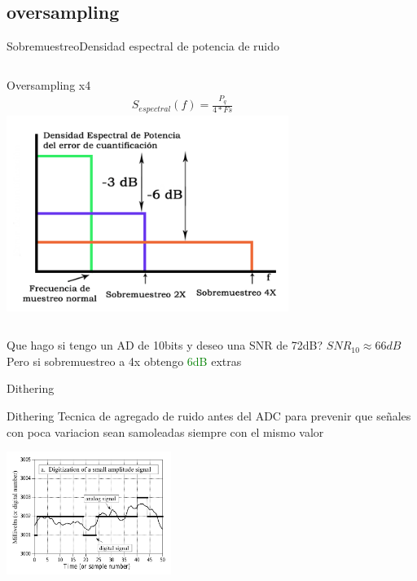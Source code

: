  \subsection{oversampling}
 \begin{frame}{Sobremuestreo}{Densidad espectral de potencia de ruido}
    \begin{columns}[onlytextwidth]
       Oversampling x4
       \begin{align*}
          S_{espectral}(f) = \frac{P_q}{4*Fs}
       \end{align*}
       \center\includegraphics[width=0.8\textwidth]{1_clase/oversampling}
    \end{columns}
    \vfill
    Que hago si tengo un AD de 10bits y deseo una SNR de 72dB?
    $SNR_{10}\approx 66dB$
    Pero si sobremuestreo a 4x obtengo \textcolor{green}{6dB} extras
 \end{frame}
 \begin{frame}{Dithering}{}
    \begin{block}{Dithering}
       Tecnica de agregado de ruido antes del ADC para prevenir que señales con poca variacion sean samoleadas siempre con el mismo valor
    \end{block}
       \center\includegraphics[width=0.4\textwidth]{1_clase/dither}
    \vfill
 \end{frame}
